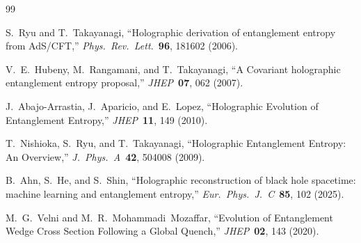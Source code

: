 \documentclass[11pt,a4paper]{article}
\begin{document}
\begin{thebibliography}{99}

S.~Ryu and T.~Takayanagi,
``Holographic derivation of entanglement entropy from AdS/CFT,''
\textit{Phys.\ Rev.\ Lett.}\ \textbf{96}, 181602 (2006).

V.~E.~Hubeny, M.~Rangamani, and T.~Takayanagi,
``A Covariant holographic entanglement entropy proposal,''
\textit{JHEP}\ \textbf{07}, 062 (2007).

J.~Abajo-Arrastia, J.~Aparicio, and E.~Lopez,
``Holographic Evolution of Entanglement Entropy,''
\textit{JHEP}\ \textbf{11}, 149 (2010).

T.~Nishioka, S.~Ryu, and T.~Takayanagi,
``Holographic Entanglement Entropy: An Overview,''
\textit{J.\ Phys.\ A}\ \textbf{42}, 504008 (2009).

B.~Ahn, S.~He, and S.~Shin,
``Holographic reconstruction of black hole spacetime: machine learning and entanglement entropy,''
\textit{Eur.\ Phys.\ J.\ C}\ \textbf{85}, 102 (2025).

M.~G.~Velni and M.~R.~Mohammadi~Mozaffar,
``Evolution of Entanglement Wedge Cross Section Following a Global Quench,''
\textit{JHEP}\ \textbf{02}, 143 (2020).

\end{thebibliography}
\end{document}
